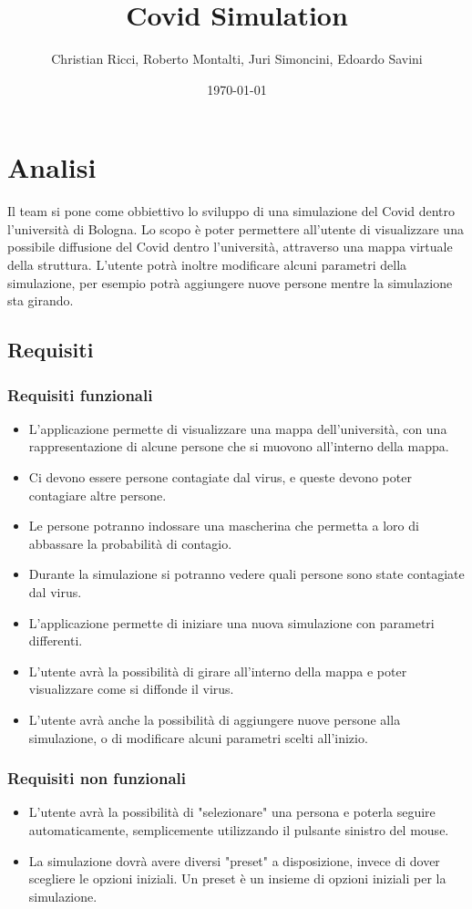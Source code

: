 \documentclass[a4paper,12pt]{report}
\title{Covid Simulation}
\author{Christian Ricci, Roberto Montalti, Juri Simoncini, Edoardo Savini}
\date{\today}
\begin{document}
\maketitle

\tableofcontents

\chapter{Analisi}

Il team si pone come obbiettivo lo sviluppo di una simulazione del Covid dentro l'università di Bologna. Lo scopo è poter permettere all'utente di visualizzare una possibile diffusione del Covid dentro l'università, attraverso una mappa virtuale della struttura. L'utente potrà inoltre modificare alcuni parametri della simulazione, per esempio potrà aggiungere nuove persone mentre la simulazione sta girando.

\section{Requisiti}

\subsection{Requisiti funzionali}
\begin{itemize}
\item L'applicazione permette di visualizzare una mappa dell'università, con una rappresentazione di alcune persone che si muovono all'interno della mappa.
\item Ci devono essere persone contagiate dal virus, e queste devono poter contagiare altre persone.
\item Le persone potranno indossare una mascherina che permetta a loro di abbassare la probabilità di contagio.
\item Durante la simulazione si potranno vedere quali persone sono state contagiate dal virus.
\item L'applicazione permette di iniziare una nuova simulazione con parametri differenti.
\item L'utente avrà la possibilità di girare all'interno della mappa e poter visualizzare come si diffonde il virus.
\item L'utente avrà anche la possibilità di aggiungere nuove persone alla simulazione, o di modificare alcuni parametri scelti all'inizio.
\end{itemize}

\subsection{Requisiti non funzionali}
\begin{itemize}
\item L'utente avrà la possibilità di "selezionare" una persona e poterla seguire automaticamente, semplicemente utilizzando il pulsante sinistro del mouse.
\item La simulazione dovrà avere diversi "preset" a disposizione, invece di dover scegliere le opzioni iniziali. Un preset è un insieme di opzioni iniziali per la simulazione.
\end{itemize}
\end{document}
